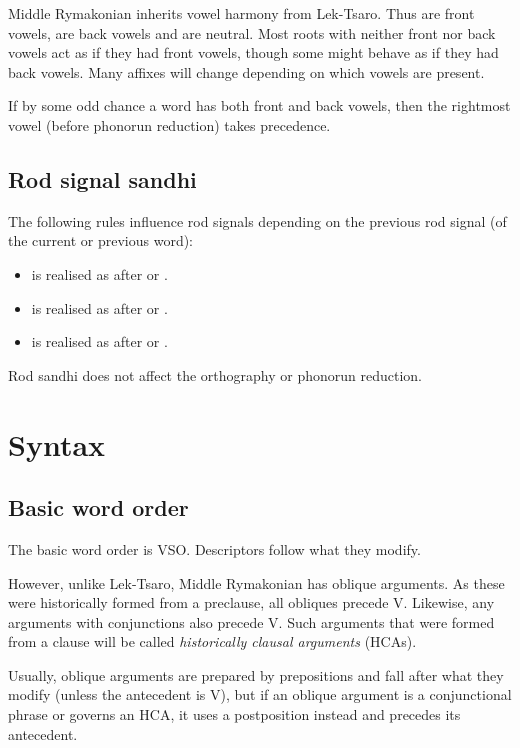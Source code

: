 \documentclass{book}
\newcommand{\lname}{Middle Rymakonian}
\begin{document}
\lname{} inherits vowel harmony from Lek-Tsaro. Thus  are front vowels,  are back vowels and  are neutral. Most roots with neither front nor back vowels act as if they had front vowels, though some might behave as if they had back vowels. Many affixes will change depending on which vowels are present.

If by some odd chance a word has both front and back vowels, then the rightmost vowel (before phonorun reduction) takes precedence.

\section{Rod signal sandhi}

The following rules influence rod signals depending on the previous rod signal (of the current or previous word):

\begin{itemize}
    \item {} is realised as  after  or .
    \item {} is realised as  after  or .
    \item {} is realised as  after  or .
\end{itemize}

Rod sandhi does not affect the orthography or phonorun reduction.

\chapter{Syntax}

\section{Basic word order}

The basic word order is VSO. Descriptors follow what they modify.

However, unlike Lek-Tsaro, \lname{} has oblique arguments. As these were historically formed from a preclause, all obliques precede V. Likewise, any arguments with conjunctions also precede V. Such arguments that were formed from a clause will be called \emph{historically clausal arguments} (HCAs).

Usually, oblique arguments are prepared by prepositions and fall after what they modify (unless the antecedent is V), but if an oblique argument is a conjunctional phrase or governs an HCA, it uses a postposition instead and precedes its antecedent.
\end{document}
